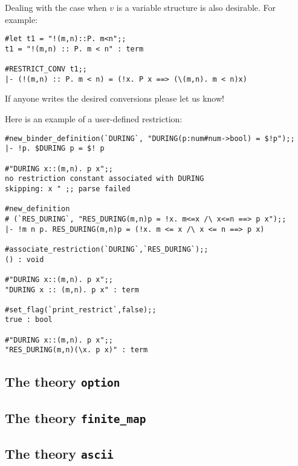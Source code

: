 \begin{hol}
{\small\verb%   RES_FORALL %}$P${\small\verb% (\%}$v$\ml{.}$B$\ml{[}$v$\ml{])  ---->  !}$v$\ml{. }$P$ $v$\ml{ ==> }$B$\ml{[}$v$\ml{]}
\end{hol}

\noindent Dealing with the case when
$v$ is a variable structure is also desirable. For example:

\begin{session}\begin{verbatim}
#let t1 = "!(m,n)::P. m<n";;
t1 = "!(m,n) :: P. m < n" : term

#RESTRICT_CONV t1;;
|- (!(m,n) :: P. m < n) = (!x. P x ==> (\(m,n). m < n)x)

\end{verbatim}\end{session}

\noindent If anyone writes the desired conversions please let us know!

Here is an example of a user-defined restriction:

\begin{session}\begin{verbatim}
#new_binder_definition(`DURING`, "DURING(p:num#num->bool) = $!p");;
|- !p. $DURING p = $! p

#"DURING x::(m,n). p x";;
no restriction constant associated with DURING
skipping: x " ;; parse failed

#new_definition
# (`RES_DURING`, "RES_DURING(m,n)p = !x. m<=x /\ x<=n ==> p x");;
|- !m n p. RES_DURING(m,n)p = (!x. m <= x /\ x <= n ==> p x)

#associate_restriction(`DURING`,`RES_DURING`);;
() : void

#"DURING x::(m,n). p x";;
"DURING x :: (m,n). p x" : term

#set_flag(`print_restrict`,false);;
true : bool

#"DURING x::(m,n). p x";;
"RES_DURING(m,n)(\x. p x)" : term
\end{verbatim}\end{session}


\subsection{The theory {\tt option}}
\subsection{The theory {\tt finite\_map}}
\subsection{The theory {\tt ascii}}
